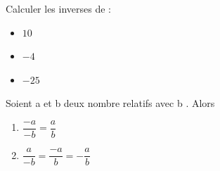 \begin{exercicebox}
    Calculer les inverses de : 
    \begin{itemize}
        \item $10$
    \item $-4$
    \item $-25$
    \end{itemize}
\end{exercicebox}
\begin{propbox}
    Soient a et b deux nombre relatifs avec b . Alors
    \begin{enumerate}
        \item $\dfrac{-a}{-b} = \dfrac{a}{b}$
        \item $\dfrac{a}{-b} = \dfrac{-a}{b} = -\dfrac{a}{b}$
    \end{enumerate}
\end{propbox}
